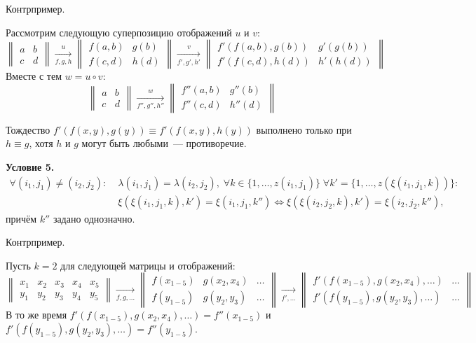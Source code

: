 \documentclass[a4paper, 12pt]{report}
\begin{document}
Контрпример.

Рассмотрим следующую суперпозицию отображений $u$ и $v$:
\[
\begin{Vmatrix}
a & b\\
c & d
\end{Vmatrix}
\mathop{\rightarrow}\limits^u_{f,g,h}
\begin{Vmatrix}
f(a,b) & g(b)\\
f(c,d) & h(d)
\end{Vmatrix}
\mathop{\rightarrow}\limits^v_{f',g',h'}
\begin{Vmatrix}
f'(f(a,b), g(b)) & g'(g(b))\\
f'(f(c,d),h(d)) & h'(h(d))
\end{Vmatrix}
\]
Вместе с тем $w = u \circ v$:
\[
\begin{Vmatrix}
a & b\\
c & d
\end{Vmatrix}
\mathop{\rightarrow}\limits^w_{f'',g'',h''}
\begin{Vmatrix}
f''(a,b) & g''(b)\\
f''(c,d) & h''(d)
\end{Vmatrix}
\]

Тождество $f'(f(x,y), g(y)) \equiv f'(f(x,y), h(y))$ выполнено только при $h \equiv g$, хотя $h$ и $g$ могут быть любыми~--- противоречие.

\textbf{Условие 5.}
\begin{equation*}
\begin{split}
 \forall (i_1, j_1) \neq (i_2, j_2): \; & \lambda(i_1, j_1) = \lambda(i_2, j_2), \; \forall k \in \{1, \ldots, z(i_1, j_1)\} \; \forall k' = \{ 1, \ldots, z(\xi(i_1, j_1, k)) \}:\\ & \xi(\xi(i_1, j_1, k), k') = \xi(i_1, j_1, k'') \Leftrightarrow
\xi(\xi(i_2, j_2, k), k') = \xi(i_2, j_2, k''),
\end{split}
\end{equation*}
причём $k''$ задано однозначно.

Контрпример.

Пусть $k = 2$ для следующей матрицы и отображений:
\[
\begin{Vmatrix}
x_1 & x_2 & x_3 & x_4 & x_5\\
y_1 & y_2 & y_3 & y_4 & y_5
\end{Vmatrix}
\mathop{\rightarrow}\limits_{f, g, \ldots}
\begin{Vmatrix}
f(x_{1-5}) & g(x_2, x_4) & \ldots\\
f(y_{1-5}) & g(y_2, y_3) & \ldots
\end{Vmatrix}
\mathop{\rightarrow}\limits_{f', \ldots}
\begin{Vmatrix}
f'(f(x_{1-5}), g(x_2, x_4), \ldots) & \ldots\\
f'(f(y_{1-5}), g(y_2, y_3), \ldots) & \ldots
\end{Vmatrix}
\]
В то же время $f'(f(x_{1-5}), g(x_2, x_4), \ldots) = f''(x_{1-5})$ и $f'(f(y_{1-5}), g(y_2, y_3), \ldots) = f''(y_{1-5})$.
\end{document}
